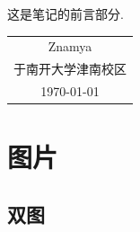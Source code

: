 \documentclass[UTF8,a4paper,12pt]{ctexart}
\begin{document}
这是笔记的前言部分. 
~\\
\begin{flushright}
    \begin{tabular}{c}
        Znamya\\
        于南开大学津南校区\\
        \today
    \end{tabular}
\end{flushright}

\newpage
{}
\setcounter{page}{1}
\tableofcontents
\newpage
\setcounter{page}{1}



\section{图片}
\subsection{双图}
\end{document}
